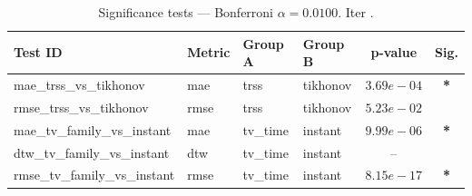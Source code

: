 ﻿%
\begin{table}[ht]
\centering
\caption[EEG reconstruction - Iteration it20]{Significance tests — Bonferroni $\alpha=0.0100$. Iter .}
\label{tab:sig_it20_synthetic_alpha_high_missing}
\small
\begin{tabular}{llllcc}
\toprule
Test ID & Metric & Group A & Group B & p-value & Sig. \\
\midrule
mae\_trss\_vs\_tikhonov & mae & trss & tikhonov & $3.69e-04$ & \textbf{*} \\
rmse\_trss\_vs\_tikhonov & rmse & trss & tikhonov & $5.23e-02$ &  \\
mae\_tv\_family\_vs\_instant & mae & tv\_time & instant & $9.99e-06$ & \textbf{*} \\
dtw\_tv\_family\_vs\_instant & dtw & tv\_time & instant & -- &  \\
rmse\_tv\_family\_vs\_instant & rmse & tv\_time & instant & $8.15e-17$ & \textbf{*} \\
\bottomrule
\end{tabular}
\end{table}







